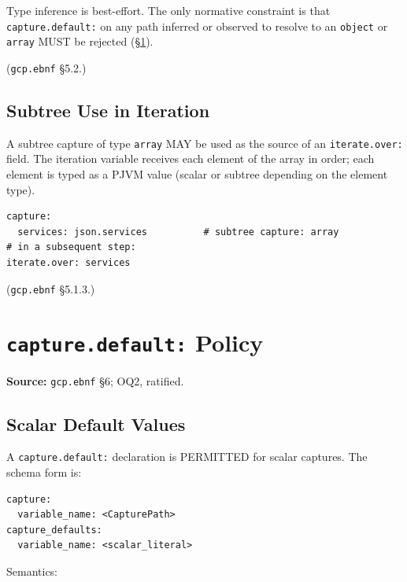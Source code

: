 Type inference is best-effort.
The only normative constraint is that
\texttt{capture.default:} on any path inferred or observed to resolve
to an \texttt{object} or \texttt{array} MUST be rejected
(\S\ref{sec:gcp:default}).

(\texttt{gcp.ebnf} \S5.2.)

\subsection{Subtree Use in Iteration}
\label{subsec:gcp:subtree:iteration}

A subtree capture of type \texttt{array} MAY be used as the source of an
\texttt{iterate.over:} field.
The iteration variable receives each element of the array in order;
each element is typed as a PJVM value (scalar or subtree depending on the
element type).

\begin{verbatim}
capture:
  services: json.services          # subtree capture: array
# in a subsequent step:
iterate.over: services
\end{verbatim}

(\texttt{gcp.ebnf} \S5.1.3.)

\section{\texttt{capture.default:} Policy}
\label{sec:gcp:default}

\noindent\textbf{Source:} \texttt{gcp.ebnf} \S6; OQ2, ratified.

\subsection{Scalar Default Values}
\label{subsec:gcp:default:scalar}

A \texttt{capture.default:} declaration is PERMITTED for scalar captures.
The schema form is:

\begin{verbatim}
capture:
  variable_name: <CapturePath>
capture_defaults:
  variable_name: <scalar_literal>
\end{verbatim}

Semantics:

